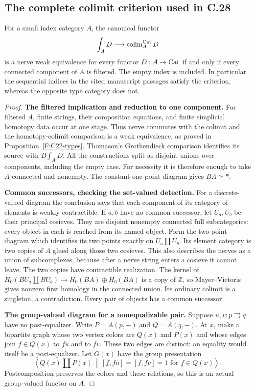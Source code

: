\subsection{The complete colimit criterion used in C.28}
\begin{theorem}
\label{F:C27-colimits}
For a small index category $A$, the canonical functor
\[
 \int_A D\longrightarrow\operatorname{colim}_A^{\mathrm {Cat}}D
\]
is a nerve weak equivalence for every functor $D:A\to\mathrm {Cat}$
if and only if every connected component of $A$ is filtered.
The empty index is included. In particular the sequential indices
in the cited manuscript passages satisfy the criterion, whereas
the opposite type category does not.
\end{theorem}
\begin{proof}
\textbf{The filtered implication and reduction to one component.}
For filtered $A$, finite strings, their composition equations,
and finite simplicial homotopy data occur at one stage. Thus
nerve commutes with the colimit and the homotopy-colimit comparison
is a weak equivalence, as proved in Proposition~\ref{F:C22-types}.
Thomason's Grothendieck comparison identifies its source with
$B\int_A D$. All the constructions split as disjoint unions over
components, including the empty case. For necessity it is therefore
enough to take $A$ connected and nonempty. The constant one-point
diagram gives $BA\simeq *$.

\textbf{Common successors, checking the set-valued detection.}
For a discrete-valued diagram the conclusion says that each
component of its category of elements is weakly contractible.
If $a,b$ have no common successor, let $U_a,U_b$ be their principal
cosieves. They are disjoint nonempty connected full subcategories:
every object in each is reached from its named object. Form the
two-point diagram which identifies its two points exactly on
$U_a\amalg U_b$. Its element category is two copies of $A$ glued
along those two cosieves. This also describes the nerves as a union
of subcomplexes, because after a nerve string enters a cosieve it
cannot leave. The two copies have contractible realization. The
kernel of
$H_0(BU_a\amalg BU_b)\to H_0(BA)\oplus H_0(BA)$ is a copy of
$\mathbb Z$, so Mayer--Vietoris gives nonzero first homology in
the connected union. Its ordinary colimit is a singleton, a
contradiction. Every pair of objects has a common successor.

\textbf{The group-valued diagram for a nonequalizable pair.}
Suppose $u,v:p\rightrightarrows q$ have no post-equalizer. Write
$P=A(p,-)$ and $Q=A(q,-)$. At $x$, make a bipartite graph whose
two vertex colors are $Q(x)$ and $P(x)$ and whose edges join
$f\in Q(x)$ to $fu$ and to $fv$. These two edges are distinct:
an equality would itself be a post-equalizer. Let $G(x)$ have
the group presentation
\[
 \left\langle Q(x)\amalg P(x)\ \middle|\
       [f,fu]=[f,fv]=1\text{ for }f\in Q(x)\right\rangle.
\]
Postcomposition preserves the colors and these relations, so this
is an actual group-valued functor on $A$.


\end{proof}
